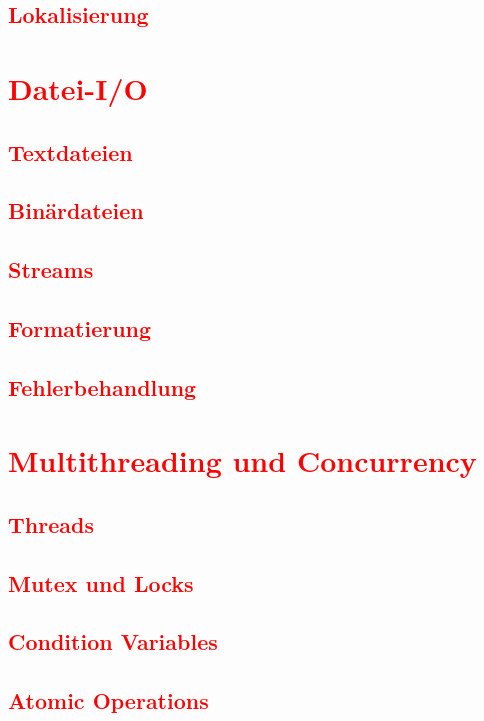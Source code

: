 \section{\textcolor{red}{Lokalisierung}}\label{sec:localization}

\cleardoublepage\chapter{\textcolor{red}{Datei-I/O}}\label{chap:file-io}
\section{\textcolor{red}{Textdateien}}\label{sec:text-files}
\section{\textcolor{red}{Binärdateien}}\label{sec:binary-files}
\section{\textcolor{red}{Streams}}\label{sec:streams}
\section{\textcolor{red}{Formatierung}}\label{sec:formatting}
\section{\textcolor{red}{Fehlerbehandlung}}\label{sec:error-handling}


\cleardoublepage\chapter{\textcolor{red}{Multithreading und Concurrency}}\label{chap:multithreading}
\section{\textcolor{red}{Threads}}\label{sec:threads}
\section{\textcolor{red}{Mutex und Locks}}\label{sec:mutex-locks}
\section{\textcolor{red}{Condition Variables}}\label{sec:condition-variables}
\section{\textcolor{red}{Atomic Operations}}\label{sec:atomic-operations}
